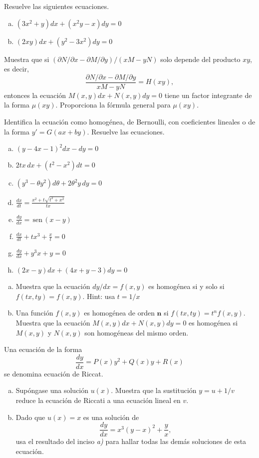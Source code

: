 \documentclass[12pt]{exam}
\renewcommand{\sin}{\,\text{sen}\,}
\begin{document}
    
    \begin{questions}
     \question%
     Resuelve las siguientes ecuaciones.
     \begin{enumerate} [a)]
			\item $(3x^2+y)dx+(x^2y-x)dy=0$
		  	\item $(2xy)dx+(y^2-3x^2)dy=0$
     \end{enumerate}

     
     \question%
     Muestra que si $(\partial N/\partial x-\partial M/\partial y)/(xM-yN)$ solo depende del producto $xy$, es decir, $$\frac{\partial N/\partial x-\partial M/\partial y}{xM-yN}=H(xy),$$ entonces la ecuación $M(x,y)dx+N(x,y)dy=0$ tiene un factor integrante de la forma $\mu(xy)$. Proporciona la fórmula general para $\mu(xy)$.
     
     \question%
     Identifica la ecuación como homogénea, de Bernoulli, con coeficientes lineales o de la forma $y'=G(ax+by)$. Resuelve las ecuaciones.
     \begin{enumerate}[a)]
     	\item $(y-4x-1)^2dx-dy=0$
        \item $2tx\,dx+(t^2-x^2)dt=0$
        \item $(y^3-\theta y^2)d\theta+2\theta^2y\,dy=0$
        \item $\frac{dx}{dt}=\frac{x^2+t\sqrt{t^2+x^2}}{tx}$
        \item $\frac{dy}{dx}= \sin(x-y)$
        \item $\frac{dx}{dt}+tx^3+\frac{x}{t}=0$
        \item $\frac{dy}{dx}+y^3x+y=0$
        \item $(2x-y)dx+(4x+y-3)dy=0$
       \end{enumerate}
        
     \question%
     \begin{enumerate}[a)]
     		\item Muestra que la ecuación $dy/dx=f(x,y)$ es homogénea si y solo si $f(tx,ty)=f(x,y)$. Hint: usa $t=1/x$
            \item Una función $f(x,y)$ es homogénea de orden $\mathbf{n}$ si $f(tx,ty)=t^nf(x,y)$. Muestra que la ecuación $M(x,y)dx+N(x,y)dy=0$ es homogénea si $M(x,y)$ y $N(x,y)$ son homogéneas del mismo orden.
     \end{enumerate}
     

     \question%
     Una ecuación de la forma $$\frac{dy}{dx}=P(x)y^2+Q(x)y+R(x)$$ se denomina ecuación de Riccat.
     \begin{enumerate}[a)]
     		\item Supóngase una solución $u(x)$. Muestra que la sustitución $y=u+1/v$ reduce la ecuación de 
     		Riccati a una ecuación lineal en $v$.
            \item Dado que $u(x)=x$ es una solución de $$\frac{dy}{dx}=x^3(y-x)^2+\frac{y}{x},$$ usa el resultado del inciso \textit{a)} para hallar todas las demás soluciones de esta ecuación.
     \end{enumerate}


\end{questions}
\end{document}
